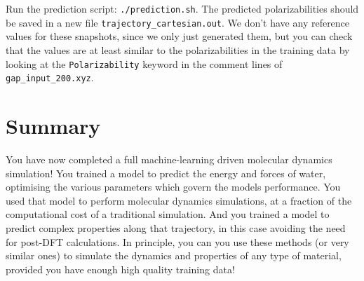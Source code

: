 \documentclass{article}
\begin{document}
Run the prediction script: \verb|./prediction.sh|. The predicted polarizabilities should be saved in a new file \verb|trajectory_cartesian.out|. We don't have any reference values for these snapshots, since we only just generated them, but you can check that the values are at least similar to the polarizabilities in the training data by looking at the \verb|Polarizability| keyword in the comment lines of \verb|gap_input_200.xyz|.


\section{Summary}
You have now completed a full machine-learning driven molecular dynamics simulation! You trained a model to predict the energy and forces of water, optimising the various parameters which govern the models performance. You used that model to perform molecular dynamics simulations, at a fraction of the computational cost of a traditional simulation. And you trained a model to predict complex properties along that trajectory, in this case avoiding the need for post-DFT calculations. In principle, you can you use these methods (or very similar ones) to simulate the dynamics and properties of any type of material, provided you have enough high quality training data!
\end{document}
